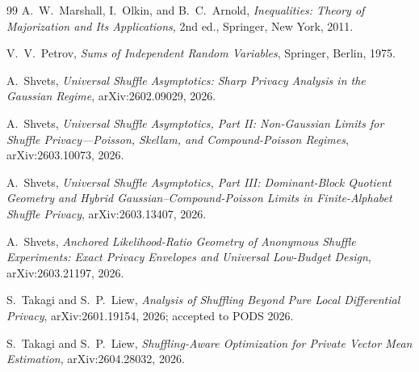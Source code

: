 \documentclass[11pt]{amsart}
\numberwithin{equation}{section}
\theoremstyle{definition}
\begin{document}
\begin{thebibliography}{99}
A.~W.~Marshall, I.~Olkin, and B.~C.~Arnold,
\emph{Inequalities: Theory of Majorization and Its Applications},
2nd ed., Springer, New York, 2011.

V.~V.~Petrov,
\emph{Sums of Independent Random Variables},
Springer, Berlin, 1975.

A.~Shvets,
\emph{Universal Shuffle Asymptotics: Sharp Privacy Analysis in the Gaussian Regime},
arXiv:2602.09029, 2026.

A.~Shvets,
\emph{Universal Shuffle Asymptotics, Part II: Non-Gaussian Limits for Shuffle Privacy---Poisson, Skellam, and Compound-Poisson Regimes},
arXiv:2603.10073, 2026.

A.~Shvets,
\emph{Universal Shuffle Asymptotics, Part III: Dominant-Block Quotient Geometry and Hybrid Gaussian--Compound-Poisson Limits in Finite-Alphabet Shuffle Privacy},
arXiv:2603.13407, 2026.

A.~Shvets,
\emph{Anchored Likelihood-Ratio Geometry of Anonymous Shuffle Experiments: Exact Privacy Envelopes and Universal Low-Budget Design},
arXiv:2603.21197, 2026.

S.~Takagi and S.~P.~Liew,
\emph{Analysis of Shuffling Beyond Pure Local Differential Privacy},
arXiv:2601.19154, 2026; accepted to PODS 2026.

S.~Takagi and S.~P.~Liew,
\emph{Shuffling-Aware Optimization for Private Vector Mean Estimation},
arXiv:2604.28032, 2026.

\end{thebibliography}
\end{document}
